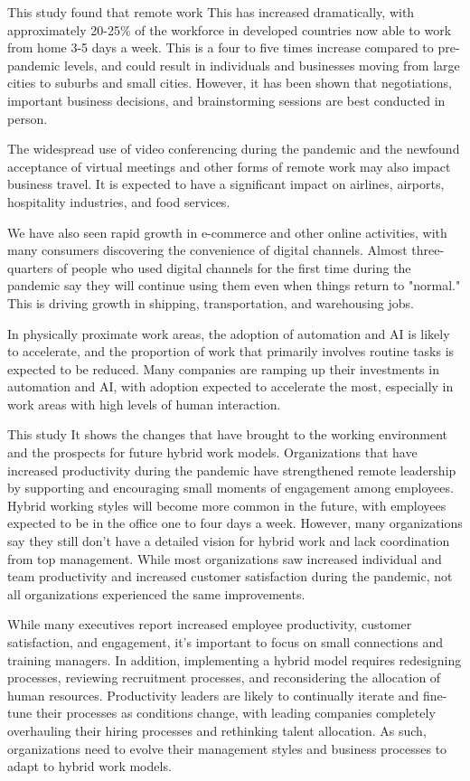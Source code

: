 \documentclass[12pt]{article}
\begin{document}
This study \cite{ref16} found that remote work This has increased dramatically,
with approximately
20-25\% of the workforce in developed countries now able to work from home 3-5
days a week. This is a four to five times increase compared to pre-pandemic
levels, and could result in individuals and businesses moving from large cities
to suburbs and small cities. However, it has been shown that negotiations,
important business decisions, and brainstorming sessions are best conducted in
person.

The widespread use of video conferencing during the pandemic and the newfound
acceptance of virtual meetings and other forms of remote work may also impact
business travel. It is expected to have a significant impact on airlines,
airports, hospitality industries, and food services.

We have also seen rapid growth in e-commerce and other online activities, with
many consumers discovering the convenience of digital channels. Almost
three-quarters of people who used digital channels for the first time during
the pandemic say they will continue using them even when things return to
"normal." This is driving growth in shipping, transportation, and warehousing
jobs.

In physically proximate work areas, the adoption of automation and AI is likely
to accelerate, and the proportion of work that primarily involves routine tasks
is expected to be reduced. Many companies are ramping up their investments in
automation and AI, with adoption expected to accelerate the most, especially in
work areas with high levels of human interaction.

This study \cite{ref17} It shows the changes that have brought to the working
environment and the
prospects for future hybrid work models. Organizations that have increased
productivity during the pandemic have strengthened remote leadership by
supporting and encouraging small moments of engagement among employees. Hybrid
working styles will become more common in the future, with employees expected
to be in the office one to four days a week. However, many organizations say
they still don't have a detailed vision for hybrid work and lack coordination
from top management. While most organizations saw increased individual and team
productivity and increased customer satisfaction during the pandemic, not all
organizations experienced the same improvements.

While many executives report increased employee productivity, customer
satisfaction, and engagement, it's important to focus on small connections and
training managers. In addition, implementing a hybrid model requires
redesigning processes, reviewing recruitment processes, and reconsidering the
allocation of human resources. Productivity leaders are likely to continually
iterate and fine-tune their processes as conditions change, with leading
companies completely overhauling their hiring processes and rethinking talent
allocation. As such, organizations need to evolve their management styles and
business processes to adapt to hybrid work models.
\end{document}
